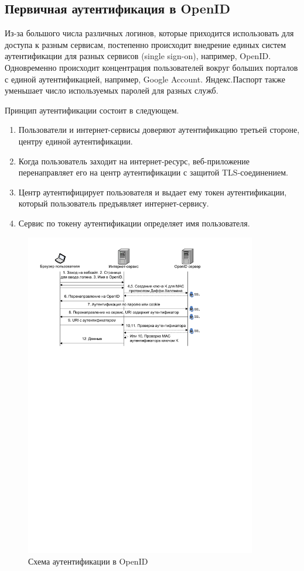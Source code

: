 \subsection{Первичная аутентификация в OpenID}

Из-за большого числа различных логинов, которые приходится использовать для доступа к разным сервисам, постепенно происходит внедрение единых систем аутентификации для разных сервисов (single sign-on), например, OpenID. Одновременно происходит концентрация пользователей вокруг больших порталов с единой аутентификацией, например, Google Account. Яндекс.Паспорт также уменьшает число используемых паролей для разных служб.

Принцип аутентификации состоит в следующем.
\begin{enumerate}
    \item Пользователи и интернет-сервисы доверяют аутентификацию третьей стороне, центру единой аутентификации.
    \item Когда пользователь заходит на интернет-ресурс, веб-приложение перенаправляет его на центр аутентификации с защитой TLS-соединением.
    \item Центр аутентифицирует пользователя и выдает ему токен аутентификации, который пользователь предъявляет интернет-сервису.
    \item Сервис по токену аутентификации определяет имя пользователя.
\end{enumerate}

\begin{figure}[!ht]
	\centering
	\includegraphics[width=0.9\textwidth]{pic/openid}
	\caption{Схема аутентификации в OpenID\label{fig:openid}}
\end{figure}


